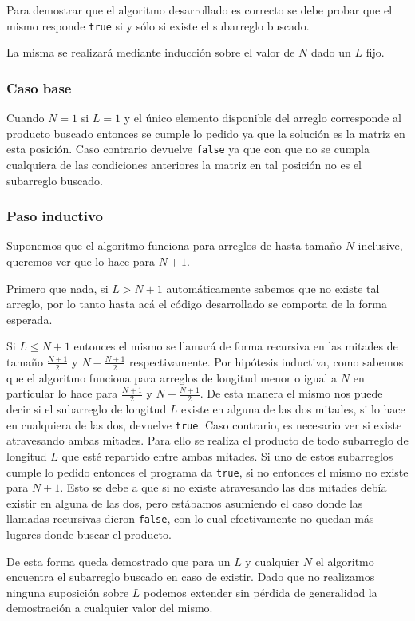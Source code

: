 Para demostrar que el algoritmo desarrollado es correcto se debe probar que el
mismo responde \texttt{true} si y sólo si existe el subarreglo buscado.

La misma se realizará mediante inducción sobre el valor de $N$ dado un $L$ fijo.

\subsubsection*{Caso base}

Cuando $N = 1$ si $L = 1$ y el único elemento disponible del arreglo corresponde
al producto buscado entonces se cumple lo pedido ya que la solución es la matriz
en esta posición. Caso contrario devuelve \texttt{false} ya que con que no se
cumpla cualquiera de las condiciones anteriores la matriz en tal posición no es
el subarreglo buscado.

\subsubsection*{Paso inductivo}

Suponemos que el algoritmo funciona para arreglos de hasta tamaño $N$ inclusive,
queremos ver que lo hace para $N + 1$.

Primero que nada, si $L > N + 1$ automáticamente sabemos que no existe tal
arreglo, por lo tanto hasta acá el código desarrollado se comporta de la forma
esperada.

Si $L \leq N + 1$ entonces el mismo se llamará de forma recursiva en las mitades
de tamaño $\frac{N + 1}{2}$ y $N - \frac{N + 1}{2}$ respectivamente. Por
hipótesis inductiva, como sabemos que el algoritmo funciona para arreglos de
longitud menor o igual a $N$ en particular lo hace para $\frac{N + 1}{2}$ y $N -
\frac{N + 1}{2}$. De esta manera el mismo nos puede decir si el subarreglo de
longitud $L$ existe en alguna de las dos mitades, si lo hace en cualquiera de
las dos, devuelve \texttt{true}. Caso contrario, es necesario ver si existe
atravesando ambas mitades. Para ello se realiza el producto de todo subarreglo
de longitud $L$ que esté repartido entre ambas mitades. Si uno de estos
subarreglos cumple lo pedido entonces el programa da \texttt{true}, si no
entonces el mismo no existe para $N + 1$. Esto se debe a que si no existe
atravesando las dos mitades debía existir en alguna de las dos, pero estábamos
asumiendo el caso donde las llamadas recursivas dieron \texttt{false}, con lo
cual efectivamente no quedan más lugares donde buscar el producto.

De esta forma queda demostrado que para un $L$ y cualquier $N$ el algoritmo
encuentra el subarreglo buscado en caso de existir. Dado que no realizamos
ninguna suposición sobre $L$ podemos extender sin pérdida de generalidad la
demostración a cualquier valor del mismo.

